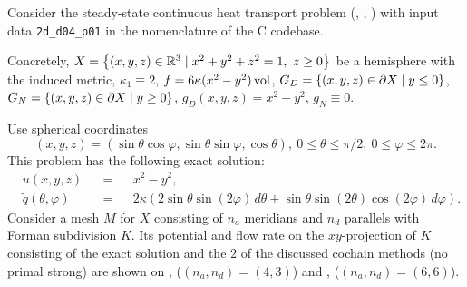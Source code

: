 \begin{example}
  \label{idec/diffusion/continuous/steady_state/examples/2d_d04_p01-example}
  Consider the steady-state continuous heat transport problem
  (,
   ,
   )
  with input data \verb|2d_d04_p01| in the nomenclature of the C codebase.

  Concretely,
    $X = \left\{ (x, y, z) \in \mathbb{R}^3 \mid x^2 + y^2 + z^2 = 1,\ z \geq 0 \right\}$ be a
      hemisphere with the induced metric,
    $\kappa_1 \equiv 2$,
    $f = 6 \kappa (x^2 - y^2) \mathop{\rm vol}\nolimits$,
    $G_D = \left\{ (x, y, z) \in \partial X \mid y \leq 0 \right\}$,
    $G_N = \left\{ (x, y, z) \in \partial X \mid y \geq 0 \right\}$,
    $g_D(x, y, z) = x^2 - y^2$,
    $g_N \equiv 0$.

  Use spherical coordinates
  \begin{equation}
    (x, y, z)
    = (\sin \theta \cos \varphi, \sin \theta \sin \varphi, \cos \theta),\
    0 \leq \theta \leq \pi / 2,\
    0 \leq \varphi \leq 2 \pi.
  \end{equation}
  This problem has the following exact solution:
  \begin{subequations}
    \begin{alignat}{3}
      & u(x, y, z) && = && x^2 - y^2, \\
      & \tilde{q}(\theta, \varphi) &&
      = && 2 \kappa (2 \sin \theta \sin(2 \varphi)\, d \theta
                     + \sin \theta \sin(2 \theta) \cos (2 \varphi)\, d \varphi).
    \end{alignat}
  \end{subequations}
  Consider a mesh $M$ for $X$ consisting of $n_a$ meridians and $n_d$ parallels
  with Forman subdivision $K$.
  Its potential and flow rate on the $xy$-projection of $K$ consisting of the
  exact solution and the $2$ of the discussed cochain methods (no primal strong)
  are shown on
  ,
  ($(n_a, n_d) = (4, 3)$)
  and
  ,
  ($(n_a, n_d) = (6, 6)$).
\end{example}
